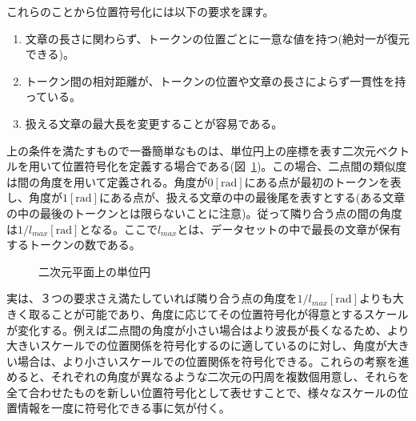 これらのことから位置符号化には以下の要求を課す。
\begin{enumerate}
  \item 文章の長さに関わらず、トークンの位置ごとに一意な値を持つ(絶対一が復元できる)。
  \item トークン間の相対距離が、トークンの位置や文章の長さによらず一貫性を持っている。
  \item 扱える文章の最大長を変更することが容易である。
\end{enumerate}

上の条件を満たすもので一番簡単なものは、単位円上の座標を表す二次元ベクトルを用いて位置符号化を定義する場合である(図~\ref{fig:pos-encoding-circle})。この場合、二点間の類似度は間の角度を用いて定義される。角度が$0[\text{rad}]$にある点が最初のトークンを表し、角度が$1[\text{rad}]$にある点が、扱える文章の中の最後尾を表すとする(ある文章の中の最後のトークンとは限らないことに注意)。従って隣り合う点の間の角度は$1/l_{max} [\text{rad}]$となる。ここで$l_{max}$とは、データセットの中で最長の文章が保有するトークンの数である。

\begin{figure}
  \centering

  \caption{二次元平面上の単位円}
\label{fig:pos-encoding-circle}

\end{figure}
実は、３つの要求さえ満たしていれば隣り合う点の角度を$1/l_{max} [\text{rad}]$よりも大きく取ることが可能であり、角度に応じてその位置符号化が得意とするスケールが変化する。例えば二点間の角度が小さい場合はより波長が長くなるため、より大きいスケールでの位置関係を符号化するのに適しているのに対し、角度が大きい場合は、より小さいスケールでの位置関係を符号化できる。これらの考察を進めると、それぞれの角度が異なるような二次元の円周を複数個用意し、それらを全て合わせたものを新しい位置符号化として表せすことで、様々なスケールの位置情報を一度に符号化できる事に気が付く。


